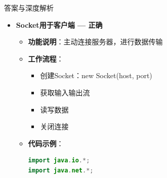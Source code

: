 \documentclass[12pt, a4paper]{ctexart}
\begin{document}
\begin{enumerate}[label=\textbf{\arabic*.}]
\begin{bluebox}{答案与深度解析}
\begin{itemize}[leftmargin=*, nosep, label={}]
\begin{itemize}[label={}, leftmargin=*, nosep]
\begin{lstlisting}[language=Java]
public class EchoServer {
    public static void main(String[] args) {
        try {
            // 创建服务器端Socket，绑定端口8080
            ServerSocket serverSocket = new ServerSocket(8080);
            System.out.println("服务器启动，等待连接...");

            // 阻塞等待客户端连接
            Socket clientSocket = serverSocket.accept();
            System.out.println("客户端已连接");

            // 获取输入输出流
            BufferedReader in = new BufferedReader(
                new InputStreamReader(clientSocket.getInputStream()));
            PrintWriter out = new PrintWriter(
                clientSocket.getOutputStream(), true);

            // 读取客户端消息
            String inputLine;
            while ((inputLine = in.readLine()) != null) {
                System.out.println("收到：" + inputLine);
                out.println("Echo: " + inputLine);  // 回射给客户端
            }

            // 关闭资源
            in.close();
            out.close();
            clientSocket.close();
            serverSocket.close();
        } catch (IOException e) {
            e.printStackTrace();
        }
    }
}
// ServerSocket在服务器端监听端口并接受连接
				      \end{lstlisting}
			            \end{itemize}

			      \item[C] \textbf{Socket用于客户端 — 正确}
			            \begin{itemize}[label={}, leftmargin=*, nosep]
				            \item \textbf{功能说明}：主动连接服务器，进行数据传输
				            \item \textbf{工作流程}：
				                  \begin{itemize}[label={}, nosep]
					                  \item 创建Socket：new Socket(host, port)
					                  \item 获取输入输出流
					                  \item 读写数据
					                  \item 关闭连接
				                  \end{itemize}
				            \item \textbf{代码示例}：
				                  \begin{lstlisting}[language=Java]
import java.io.*;
import java.net.*;


\end{lstlisting}
\end{itemize}
\end{itemize}
\end{bluebox}
\end{enumerate}
\end{document}
